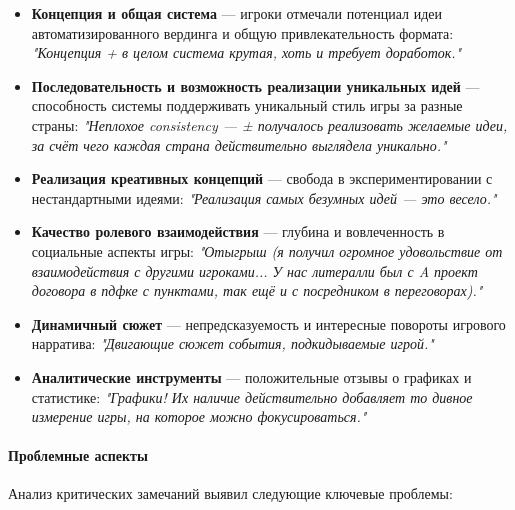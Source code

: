 \begin{itemize}
    \item \textbf{Концепция и общая система} — игроки отмечали потенциал идеи автоматизированного вердинга и общую привлекательность формата: \textit{"{}Концепция + в целом система крутая, хоть и требует доработок."{}}

    \item \textbf{Последовательность и возможность реализации уникальных идей} — способность системы поддерживать уникальный стиль игры за разные страны: \textit{"{}Неплохое consistency — ± получалось реализовать желаемые идеи, за счёт чего каждая страна действительно выглядела уникально."{}}

    \item \textbf{Реализация креативных концепций} — свобода в экспериментировании с нестандартными идеями: \textit{"{}Реализация самых безумных идей — это весело."{}}

    \item \textbf{Качество ролевого взаимодействия} — глубина и вовлеченность в социальные аспекты игры: \textit{"{}Отыгрыш (я получил огромное удовольствие от взаимодействия с другими игроками... У нас литералли был с A проект договора в пдфке с пунктами, так ещё и с посредником в переговорах)."{}}

    \item \textbf{Динамичный сюжет} — непредсказуемость и интересные повороты игрового нарратива: \textit{"{}Двигающие сюжет события, подкидываемые игрой."{}}

    \item \textbf{Аналитические инструменты} — положительные отзывы о графиках и статистике: \textit{"{}Графики! Их наличие действительно добавляет то дивное измерение игры, на которое можно фокусироваться."{}}
\end{itemize}

\paragraph{Проблемные аспекты}

Анализ критических замечаний выявил следующие ключевые проблемы:

